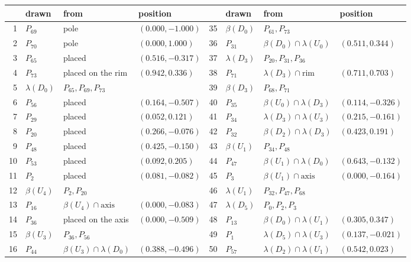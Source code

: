 \begin{table}[p]
\centering\scriptsize
\setlength{\tabcolsep}{3.2pt}
\begin{tabular}{@{}rlll@{\qquad}rlll@{}}
\toprule
& drawn & from & position & & drawn & from & position \\ \midrule
1 & $P_{69}$ & pole & $(0.000, -1.000)$ & 35 & $\beta(D_{0})$ & $P_{61}, P_{73}$ &  \\
2 & $P_{70}$ & pole & $(0.000, 1.000)$ & 36 & $P_{31}$ & $\beta(D_{0}) \cap \lambda(U_{0})$ & $(0.511, 0.344)$ \\
3 & $P_{65}$ & placed & $(0.516, -0.317)$ & 37 & $\lambda(D_{3})$ & $P_{20}, P_{31}, P_{36}$ &  \\
4 & $P_{73}$ & placed on the rim & $(0.942, 0.336)$ & 38 & $P_{71}$ & $\lambda(D_{3}) \cap \text{rim}$ & $(0.711, 0.703)$ \\
5 & $\lambda(D_{0})$ & $P_{65}, P_{69}, P_{73}$ &  & 39 & $\beta(D_{3})$ & $P_{68}, P_{71}$ &  \\
6 & $P_{56}$ & placed & $(0.164, -0.507)$ & 40 & $P_{35}$ & $\beta(U_{0}) \cap \lambda(D_{3})$ & $(0.114, -0.326)$ \\
7 & $P_{29}$ & placed & $(0.052, 0.121)$ & 41 & $P_{34}$ & $\lambda(D_{3}) \cap \lambda(U_{3})$ & $(0.215, -0.161)$ \\
8 & $P_{20}$ & placed & $(0.266, -0.076)$ & 42 & $P_{32}$ & $\beta(D_{2}) \cap \lambda(D_{3})$ & $(0.423, 0.191)$ \\
9 & $P_{48}$ & placed & $(0.425, -0.150)$ & 43 & $\beta(U_{1})$ & $P_{34}, P_{48}$ &  \\
10 & $P_{53}$ & placed & $(0.092, 0.205)$ & 44 & $P_{47}$ & $\beta(U_{1}) \cap \lambda(D_{0})$ & $(0.643, -0.132)$ \\
11 & $P_{2}$ & placed & $(0.081, -0.082)$ & 45 & $P_{3}$ & $\beta(U_{1}) \cap \text{axis}$ & $(0.000, -0.164)$ \\
12 & $\beta(U_{4})$ & $P_{2}, P_{20}$ &  & 46 & $\lambda(U_{1})$ & $P_{32}, P_{47}, P_{68}$ &  \\
13 & $P_{16}$ & $\beta(U_{4}) \cap \text{axis}$ & $(0.000, -0.083)$ & 47 & $\lambda(D_{5})$ & $P_{0}, P_{2}, P_{3}$ &  \\
14 & $P_{36}$ & placed on the axis & $(0.000, -0.509)$ & 48 & $P_{13}$ & $\beta(D_{0}) \cap \lambda(U_{1})$ & $(0.305, 0.347)$ \\
15 & $\beta(U_{3})$ & $P_{36}, P_{56}$ &  & 49 & $P_{1}$ & $\lambda(D_{5}) \cap \lambda(U_{3})$ & $(0.137, -0.021)$ \\
16 & $P_{44}$ & $\beta(U_{3}) \cap \lambda(D_{0})$ & $(0.388, -0.496)$ & 50 & $P_{57}$ & $\lambda(D_{2}) \cap \lambda(U_{1})$ & $(0.542, 0.023)$ \\

\end{tabular}
\end{table}
